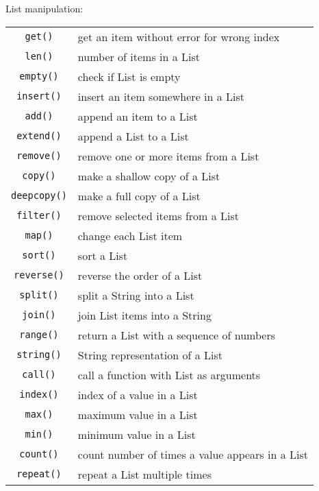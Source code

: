List manipulation:
\label{list-functions}
\begin{center} \begin{tabular}{c l}
				\verb!get()! & get an item without error for wrong index \\
				\verb!len()! & number of items in a List \\
				\verb!empty()! & check if List is empty \\
				\verb!insert()! & insert an item somewhere in a List \\
				\verb!add()! & append an item to a List \\
				\verb!extend()! & append a List to a List \\
				\verb!remove()! & remove one or more items from a List \\
				\verb!copy()! & make a shallow copy of a List \\
				\verb!deepcopy()! & make a full copy of a List \\
				\verb!filter()! & remove selected items from a List \\
				\verb!map()! & change each List item \\
				\verb!sort()! & sort a List \\
				\verb!reverse()! & reverse the order of a List \\
				\verb!split()! & split a String into a List \\
				\verb!join()! & join List items into a String \\
				\verb!range()! & return a List with a sequence of numbers \\
				\verb!string()! & String representation of a List \\
				\verb!call()! & call a function with List as arguments \\
				\verb!index()! & index of a value in a List \\
				\verb!max()! & maximum value in a List \\
				\verb!min()! & minimum value in a List \\
				\verb!count()! & count number of times a value appears in a List \\
				\verb!repeat()! & repeat a List multiple times \\
\end{tabular} \end{center}

